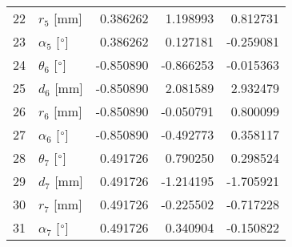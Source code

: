 \documentclass{standalone}%
\begin{document}
\begin{tabular}{llrrr}
22 &              $r_{5}$ [mm] &  0.386262 &   1.198993 &   0.812731 \\
23 &  $\alpha_{5}$ [$\degree$] &  0.386262 &   0.127181 &  -0.259081 \\
24 &  $\theta_{6}$ [$\degree$] & -0.850890 &  -0.866253 &  -0.015363 \\
25 &              $d_{6}$ [mm] & -0.850890 &   2.081589 &   2.932479 \\
26 &              $r_{6}$ [mm] & -0.850890 &  -0.050791 &   0.800099 \\
27 &  $\alpha_{6}$ [$\degree$] & -0.850890 &  -0.492773 &   0.358117 \\
28 &  $\theta_{7}$ [$\degree$] &  0.491726 &   0.790250 &   0.298524 \\
29 &              $d_{7}$ [mm] &  0.491726 &  -1.214195 &  -1.705921 \\
30 &              $r_{7}$ [mm] &  0.491726 &  -0.225502 &  -0.717228 \\
31 &  $\alpha_{7}$ [$\degree$] &  0.491726 &   0.340904 &  -0.150822 \\
\bottomrule
\end{tabular}
%
\end{document}
